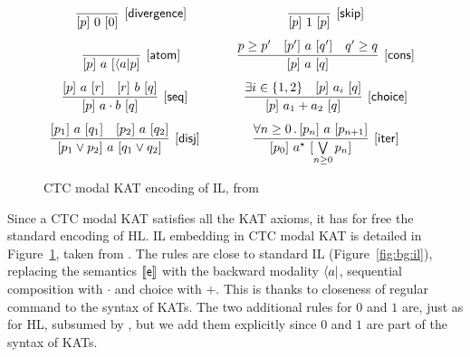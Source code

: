 \begin{figure}[t]
	\centering
	\begin{framed}
		\(
		\begin{array}{cc}
			\infer[\ilrule{divergence}]
			{\undertriple{p}{0}{0}}
			{}
			\quad &
			\infer[\ilrule{skip}]
			{\undertriple{p}{1}{p}}
			{}
			\\[7.5pt]
			\infer[\ilrule{atom}]
			{\undertriple{p}{a}{\bdiamond{a}p}}
			{}
			\quad &
			\infer[\ilrule{cons}]
			{\undertriple{p}{a}{q}}
			{p \geq p' & \undertriple{p'}{a}{q'}& q' \geq q}
			\\[7.5pt]
			\infer[\ilrule{seq}]
			{\undertriple{p}{a \cdot b}{q}}
			{\undertriple{p}{a}{r} &
				\undertriple{r}{b}{q}}
			\qquad &
			\infer[\ilrule{choice}]
			{\undertriple{p}{a_1 + a_2}{q}}
			{\exists i \in \{ 1, 2 \} & \undertriple{p}{a_i}{q}}
			\\[7.5pt]
			\infer[\ilrule{disj}]
			{\undertriple{p_1 \lor p_2}{a}{q_1 \lor q_2}}
			{\undertriple{p_1}{a}{q_1} & \undertriple{p_2}{a}{q_2} }
			\qquad &
			\infer[\ilrule{iter}]
			{\undertriple{p_0}{a^\kstar}{\bigvee\limits_{n \ge 0} p_n}}
			{\forall n \ge 0 \sdot \undertriple{p_n}{a}{p_{n+1}}}
		\end{array}
		\)
	\end{framed}
	\vspace{-1ex}
	\caption{CTC modal KAT encoding of IL, from \cite{MOH21}}\label{fig:sota:il-kat}
\end{figure}

Since a CTC modal KAT satisfies all the KAT axioms, it has for free the standard encoding of HL.
IL embedding in CTC modal KAT is detailed in Figure~\ref{fig:sota:il-kat}, taken from \cite{MOH21}. The rules are close to standard IL (Figure~\ref{fig:bg:il}), replacing the semantics $\llbracket\mathsf{e}\rrbracket$ with the backward modality $\langle a \vert$, sequential composition with $\cdot$ and choice with $+$. This is thanks to closeness of regular command to the syntax of KATs. The two additional rules for $0$ and $1$ are, just as for HL, subsumed by , but we add them explicitly since $0$ and $1$ are part of the syntax of KATs.

